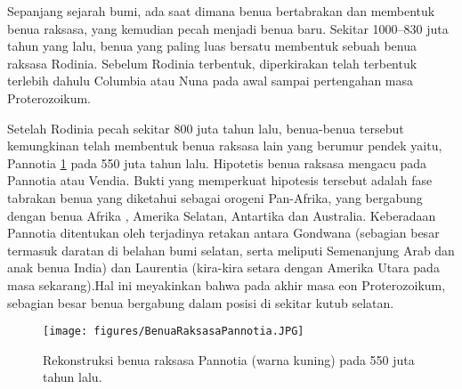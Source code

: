 Sepanjang sejarah bumi, ada saat dimana benua bertabrakan dan membentuk benua raksasa, yang kemudian pecah menjadi benua baru. Sekitar 1000–830 juta tahun yang lalu, benua yang paling luas bersatu membentuk sebuah benua raksasa Rodinia. Sebelum Rodinia terbentuk, diperkirakan telah terbentuk terlebih dahulu Columbia atau Nuna pada awal sampai pertengahan masa Proterozoikum.

Setelah Rodinia pecah sekitar 800 juta tahun lalu, benua-benua tersebut kemungkinan telah membentuk benua raksasa lain yang berumur pendek yaitu, Pannotia \ref{Benua Raksasa Pannotia} pada 550 juta tahun lalu. Hipotetis benua raksasa mengacu pada Pannotia atau Vendia. Bukti yang memperkuat hipotesis tersebut adalah fase tabrakan benua yang diketahui sebagai orogeni Pan-Afrika, yang bergabung dengan benua Afrika , Amerika Selatan, Antartika dan Australia. Keberadaan Pannotia ditentukan oleh terjadinya retakan antara Gondwana (sebagian besar termasuk daratan di belahan bumi selatan, serta meliputi Semenanjung Arab dan anak benua India) dan Laurentia (kira-kira setara dengan Amerika Utara pada masa sekarang).Hal ini meyakinkan bahwa pada akhir masa eon Proterozoikum, sebagian besar benua bergabung dalam posisi di sekitar kutub selatan.

\begin{figure}[ht]
    \centerline{\texttt{[image: figures/BenuaRaksasaPannotia.JPG]}}
    \caption{Rekonstruksi benua raksasa Pannotia (warna kuning) pada 550 juta tahun lalu.}
    \label{Benua Raksasa Pannotia}
    \end{figure}


